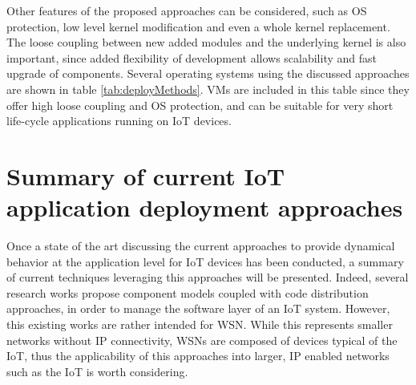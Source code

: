 Other features of the proposed approaches can be considered, such as OS protection, low level kernel modification and even a whole kernel replacement.
The loose coupling between new added modules and the underlying kernel is also important, since added flexibility of development allows scalability and fast upgrade of components.
Several operating systems using the discussed approaches are shown in table \ref{tab:deployMethods}.
VMs are included in this table since they offer high loose coupling and OS protection, and can be suitable for very short life-cycle applications running on IoT devices.

\section{Summary of current IoT application deployment approaches}
Once a state of the art discussing the current approaches to provide dynamical behavior at the application level for IoT devices has been conducted, a summary of current techniques leveraging this approaches will be presented.
Indeed, several research works propose component models coupled with code distribution approaches, in order to manage the software layer of an IoT system.
However, this existing works are rather intended for WSN.
While this represents smaller networks without IP connectivity, WSNs are composed of devices typical of the IoT, thus the applicability of this approaches into larger, IP enabled networks such as the IoT is worth considering.

